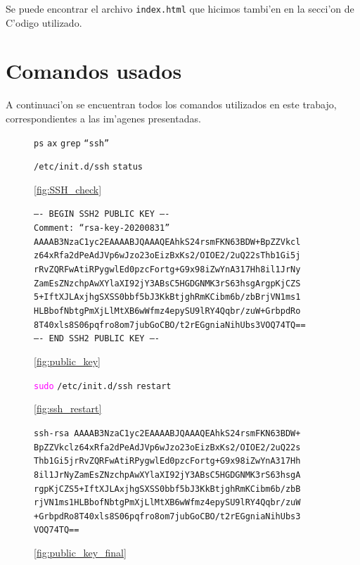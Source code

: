\documentclass[11pt]{article}
\newcommand{\imagecaption}[1]{\vspace{-7pt}\caption*{\char91\ref{fig:#1}\char93}}
\newcommand{\codetext}[2]{\large\texttt{\textcolor{#1}{#2}}}
\begin{document}
	Se puede encontrar el archivo  \label{fig:index_ours_code}\texttt{index.html} que hicimos tambi'en en la secci'on de C'odigo utilizado.
		
	\section{Comandos usados}
		A continuaci'on se encuentran todos los comandos utilizados en este trabajo, correspondientes a las im'agenes presentadas.
		
		\begin{figure}[H]
			\centering
			\begin{code-box}
				\codetext{light-blue}{ps} \codetext{light-orange}{ax} \textbar\/ \codetext{light-blue}{grep} \codetext{light-red}{``ssh''}
				
				\codetext{light-blue}{/etc/init.d/ssh} \codetext{light-orange}{status}
			\end{code-box}
			\imagecaption{SSH_check}
		\end{figure}
		
		\begin{figure}[H]
			\centering
			\begin{code-box}
				\codetext{dark-gray}{---- BEGIN SSH2 PUBLIC KEY ----\\
				Comment: ``rsa-key-20200831''\\
				AAAAB3NzaC1yc2EAAAABJQAAAQEAhkS24rsmFKN63BDW+BpZZVkcl
				z64xRfa2dPeAdJVp6wJzo23oEizBxKs2/OIOE2/2uQ22sThb1Gi5j
				rRvZQRFwAtiRPygwlEd0pzcFortg+G9x98iZwYnA317Hh8il1JrNy
				ZamEsZNzchpAwXYlaXI92jY3ABsC5HGDGNMK3rS63hsgArgpKjCZS
				5+IftXJLAxjhgSXSS0bbf5bJ3KkBtjghRmKCibm6b/zbBrjVN1ms1
				HLBbofNbtgPmXjLlMtXB6wWfmz4epySU9lRY4Qqbr/zuW+GrbpdRo
				8T40xls8S06pqfro8om7jubGoCBO/t2rEGgniaNihUbs3VOQ74TQ==\\
				---- END SSH2 PUBLIC KEY ----}
			\end{code-box}
			\imagecaption{public_key}
		\end{figure}
		
		\begin{figure}[H]
			\centering
			\begin{code-box}
				\codetext{fuchsia}{sudo} \codetext{light-blue}{/etc/init.d/ssh} \codetext{light-orange}{restart}
			\end{code-box}
			\imagecaption{ssh_restart}
		\end{figure}
		
		\begin{figure}[H]
			\centering
			\begin{code-box}
				\codetext{dark-gray}{ssh-rsa AAAAB3NzaC1yc2EAAAABJQAAAQEAhkS24rsmFKN63BDW+
				BpZZVkclz64xRfa2dPeAdJVp6wJzo23oEizBxKs2/OIOE2/2uQ22s
				Thb1Gi5jrRvZQRFwAtiRPygwlEd0pzcFortg+G9x98iZwYnA317Hh
				8il1JrNyZamEsZNzchpAwXYlaXI92jY3ABsC5HGDGNMK3rS63hsgA
				rgpKjCZS5+IftXJLAxjhgSXSS0bbf5bJ3KkBtjghRmKCibm6b/zbB
				rjVN1ms1HLBbofNbtgPmXjLlMtXB6wWfmz4epySU9lRY4Qqbr/zuW
				+GrbpdRo8T40xls8S06pqfro8om7jubGoCBO/t2rEGgniaNihUbs3
				VOQ74TQ==}
			\end{code-box}
			\imagecaption{public_key_final}
		\end{figure}
		
\end{document}
